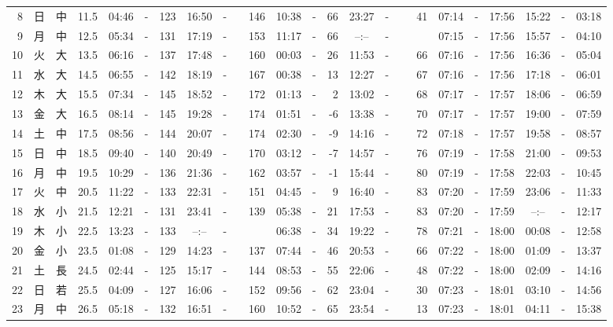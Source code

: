 \documentclass[12pt,a4j]{jsarticle}
\begin{document}
\begin{table}[htbp]
\begin{center}
{\begin{tabular}{|rc|cr|ccrccr|ccrccr|ccc|ccc|}
 8 & 日 & 中 & 11.5 &  04:46 &-& 123 &  16:50 &-& 146 &  10:38 &-&  66 &  23:27 &-&  41 & 07:14 & -& 17:56 & 15:22 & -& 03:18 \\
 9 & 月 & 中 & 12.5 &  05:34 &-& 131 &  17:19 &-& 153 &  11:17 &-&  66 &  --:-- &-&~~~~~ & 07:15 & -& 17:56 & 15:57 & -& 04:10 \\
10 & 火 & 大 & 13.5 &  06:16 &-& 137 &  17:48 &-& 160 &  00:03 &-&  26 &  11:53 &-&  66 & 07:16 & -& 17:56 & 16:36 & -& 05:04 \\
11 & 水 & 大 & 14.5 &  06:55 &-& 142 &  18:19 &-& 167 &  00:38 &-&  13 &  12:27 &-&  67 & 07:16 & -& 17:56 & 17:18 & -& 06:01 \\
12 & 木 & 大 & 15.5 &  07:34 &-& 145 &  18:52 &-& 172 &  01:13 &-&   2 &  13:02 &-&  68 & 07:17 & -& 17:57 & 18:06 & -& 06:59 \\
13 & 金 & 大 & 16.5 &  08:14 &-& 145 &  19:28 &-& 174 &  01:51 &-&  -6 &  13:38 &-&  70 & 07:17 & -& 17:57 & 19:00 & -& 07:59 \\
14 & 土 & 中 & 17.5 &  08:56 &-& 144 &  20:07 &-& 174 &  02:30 &-&  -9 &  14:16 &-&  72 & 07:18 & -& 17:57 & 19:58 & -& 08:57 \\
15 & 日 & 中 & 18.5 &  09:40 &-& 140 &  20:49 &-& 170 &  03:12 &-&  -7 &  14:57 &-&  76 & 07:19 & -& 17:58 & 21:00 & -& 09:53 \\
16 & 月 & 中 & 19.5 &  10:29 &-& 136 &  21:36 &-& 162 &  03:57 &-&  -1 &  15:44 &-&  80 & 07:19 & -& 17:58 & 22:03 & -& 10:45 \\
17 & 火 & 中 & 20.5 &  11:22 &-& 133 &  22:31 &-& 151 &  04:45 &-&   9 &  16:40 &-&  83 & 07:20 & -& 17:59 & 23:06 & -& 11:33 \\
18 & 水 & 小 & 21.5 &  12:21 &-& 131 &  23:41 &-& 139 &  05:38 &-&  21 &  17:53 &-&  83 & 07:20 & -& 17:59 & --:-- & -& 12:17 \\
19 & 木 & 小 & 22.5 &  13:23 &-& 133 &  --:-- &-&~~~~~ &  06:38 &-&  34 &  19:22 &-&  78 & 07:21 & -& 18:00 & 00:08 & -& 12:58 \\
20 & 金 & 小 & 23.5 &  01:08 &-& 129 &  14:23 &-& 137 &  07:44 &-&  46 &  20:53 &-&  66 & 07:22 & -& 18:00 & 01:09 & -& 13:37 \\
21 & 土 & 長 & 24.5 &  02:44 &-& 125 &  15:17 &-& 144 &  08:53 &-&  55 &  22:06 &-&  48 & 07:22 & -& 18:00 & 02:09 & -& 14:16 \\
22 & 日 & 若 & 25.5 &  04:09 &-& 127 &  16:06 &-& 152 &  09:56 &-&  62 &  23:04 &-&  30 & 07:23 & -& 18:01 & 03:10 & -& 14:56 \\
23 & 月 & 中 & 26.5 &  05:18 &-& 132 &  16:51 &-& 160 &  10:52 &-&  65 &  23:54 &-&  13 & 07:23 & -& 18:01 & 04:11 & -& 15:38 \\

\end{tabular}}
\end{center}
\end{table}
\end{document}
